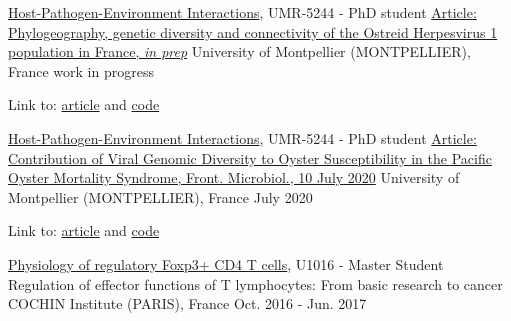 

\begin{cventries}

  \cventry
    {\href{http://ihpe.univ-perp.fr/}{Host-Pathogen-Environment Interactions}, UMR-5244 - PhD student} %
    {\href{}{Article: Phylogeography, genetic diversity and connectivity of the Ostreid Herpesvirus 1 population in France, \textit{in prep}}} %
    {University of Montpellier (MONTPELLIER), France} %
    {work in progress} %
    {
      \begin{cvitems} %
      \item Link to: {\href{DOI}{article} and \href{https://github.com/propan2one/OshV-1-molepidemio}{code}}
      \end{cvitems}
    }

  \cventry
    {\href{http://ihpe.univ-perp.fr/}{Host-Pathogen-Environment Interactions}, UMR-5244 - PhD student} %
    {\href{https://doi.org/10.3389/fmicb.2020.01579}{Article: Contribution of Viral Genomic Diversity to Oyster Susceptibility in the Pacific Oyster Mortality Syndrome, Front. Microbiol., 10 July 2020}} %
    {University of Montpellier (MONTPELLIER), France} %
    {July 2020} %
    {
      \begin{cvitems} %
        \item Link to: {\href{https://doi.org/10.3389/fmicb.2020.01579}{article} and \href{https://github.com/IHPE/DivOsHV}{code}}
      \end{cvitems}
    }

  \cventry
    {\href{https://www.institutcochin.fr/departments/3i/team-lucas/physiology-of-regulatory-foxp3-cd4-t-cells}{Physiology of regulatory Foxp3+ CD4 T cells}, U1016 - Master Student}%
    {Regulation of effector functions of T lymphocytes: From basic research to cancer} %
    {COCHIN Institute (PARIS), France} %
    {Oct. 2016 - Jun. 2017} %
    {
      \begin{cvitems} %
      \end{cvitems}
    }


\end{cventries}
